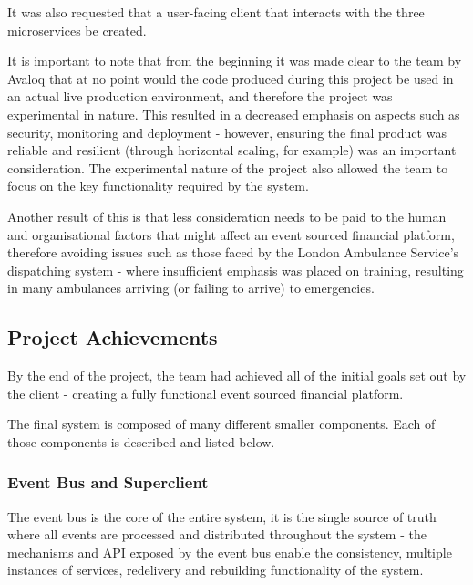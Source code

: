 \documentclass{l3proj}
\begin{document}
It was also requested that a user-facing client that interacts with the three microservices be created.

It is important to note that from the beginning it was made clear to the team by Avaloq that at no point would the code produced during this project be used in an actual live production environment, and therefore the project was experimental in nature. This resulted in a decreased emphasis on aspects such as security, monitoring and deployment - however, ensuring the final product was reliable and resilient (through horizontal scaling, for example) was an important consideration. The experimental nature of the project also allowed the team to focus on the key functionality required by the system.

Another result of this is that less consideration needs to be paid to the human and organisational factors that might affect an event sourced financial platform, therefore avoiding issues such as those faced by the London Ambulance Service's dispatching system \cite{london-ambulance} - where insufficient emphasis was placed on training, resulting in many ambulances arriving (or failing to arrive) to emergencies.

\subsection{Project Achievements}
By the end of the project, the team had achieved all of the initial goals set out by the client - creating a fully functional event sourced financial platform.

The final system is composed of many different smaller components. Each of those components is described and listed below.

\subsubsection{Event Bus and Superclient}
The event bus is the core of the entire system, it is the single source of truth where all events are processed and distributed throughout the system - the mechanisms and API exposed by the event bus enable the consistency, multiple instances of services, redelivery and rebuilding functionality of the system.
\end{document}
